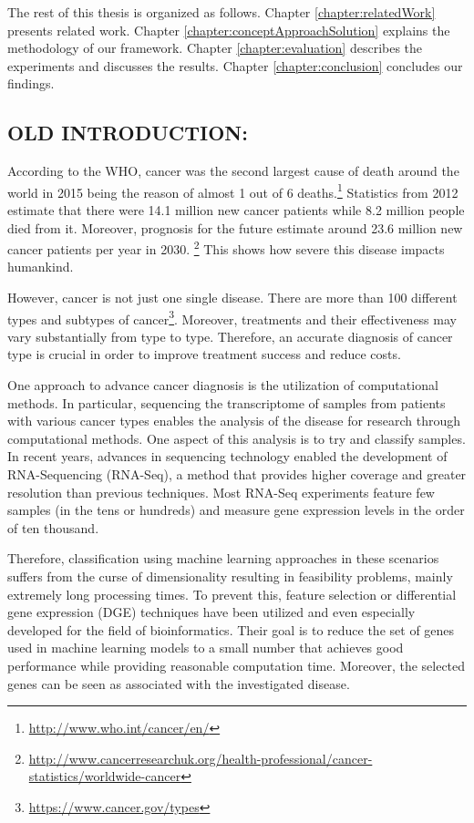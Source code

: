 The rest of this thesis is organized as follows. 
Chapter \ref{chapter:relatedWork} presents related work. 
Chapter \ref{chapter:conceptApproachSolution} explains the methodology of our framework. 
Chapter \ref{chapter:evaluation} describes the experiments and discusses the results. 
Chapter \ref{chapter:conclusion} concludes our findings.

\subsection{OLD INTRODUCTION:}

According to the WHO, cancer was the second largest cause of death around the world in 2015 being the reason of almost 1 out of 6 deaths.\footnote{\url{http://www.who.int/cancer/en/}} Statistics from 2012 estimate that there were 14.1 million new cancer patients while 8.2 million people died from it. \cite{torre2015global} Moreover, prognosis for the future estimate around 23.6 million new cancer patients per year in 2030. \footnote{\url{http://www.cancerresearchuk.org/health-professional/cancer-statistics/worldwide-cancer}} This shows how severe this disease impacts humankind.

However, cancer is not just one single disease. There are more than 100 different types and subtypes of cancer\footnote{\url{https://www.cancer.gov/types}}. Moreover, treatments and their effectiveness may vary substantially from type to type. Therefore, an accurate diagnosis of cancer type is crucial in order to improve treatment success and reduce costs. 

One approach to advance cancer diagnosis is the utilization of computational methods. In particular, sequencing the transcriptome of samples from patients with various cancer types enables the analysis of the disease for research through computational methods. One aspect of this analysis is to try and classify samples. In recent years, advances in sequencing technology enabled the development of RNA-Sequencing (RNA-Seq), a method that provides higher coverage and greater resolution than previous techniques. Most RNA-Seq experiments feature few samples (in the tens or hundreds) and measure gene expression levels in the order of ten thousand. 

Therefore, classification using machine learning approaches in these scenarios suffers from the curse of dimensionality resulting in feasibility problems, mainly extremely long processing times. To prevent this, feature selection or differential gene expression (DGE) techniques have been utilized and even especially developed for the field of bioinformatics. Their goal is to reduce the set of genes used in machine learning models to a small number that achieves good performance while providing reasonable computation time. Moreover, the selected genes can be seen as associated with the investigated disease.

